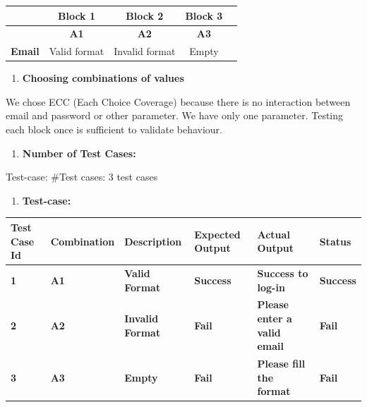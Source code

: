 \begin{table}[h!]
    \centering
    \begin{tabular}{|c|c|c|c|c|}
    \hline
    \textbf{} & \textbf{Block 1} & \textbf{Block 2} & \textbf{Block 3}  \\
    \hline
    \textbf{} & \textbf{A1} & \textbf{A2} & \textbf{A3}  \\
    \hline
    \textbf{Email} & Valid format & Invalid format & Empty \\
    \hline
    \end{tabular}
    \end{table}
    

\begin{enumerate}[resume]
    \item \textbf{Choosing combinations of values}
\end{enumerate}

\noindent
We chose ECC (Each Choice Coverage) because there is no interaction between email and password or other parameter. We have only one parameter. Testing each block once is sufficient to validate behaviour.

\begin{enumerate}[resume]
    \item \textbf{Number of Test Cases:}
\end{enumerate}

\noindent
Test-case: \#Test cases: 3 test cases

\begin{enumerate}[resume]
    \item \textbf{Test-case:}
\end{enumerate}

\begin{longtable}{|p{1cm}|p{2cm}|p{3cm}|p{2.5cm}|p{3cm}|p{1.5cm}|}
\hline
\textbf{Test Case Id} & \textbf{Combination } & \textbf{Description} & \textbf{Expected Output} & \textbf{Actual Output} & \textbf{Status} \\
\hline
\textbf{1} & \textbf{A1} & \textbf{Valid Format} & \textbf{Success} & \textbf{Success to log-in} & \textbf{Success} \\
\hline
\textbf{2} & \textbf{A2} & \textbf{Invalid Format} & \textbf{Fail} & \textbf{Please enter a valid email} & \textbf{Fail} \\
\hline
\textbf{3} & \textbf{A3} & \textbf{Empty} & \textbf{Fail} & \textbf{Please fill the format} & \textbf{Fail} \\
\hline
\end{longtable}

